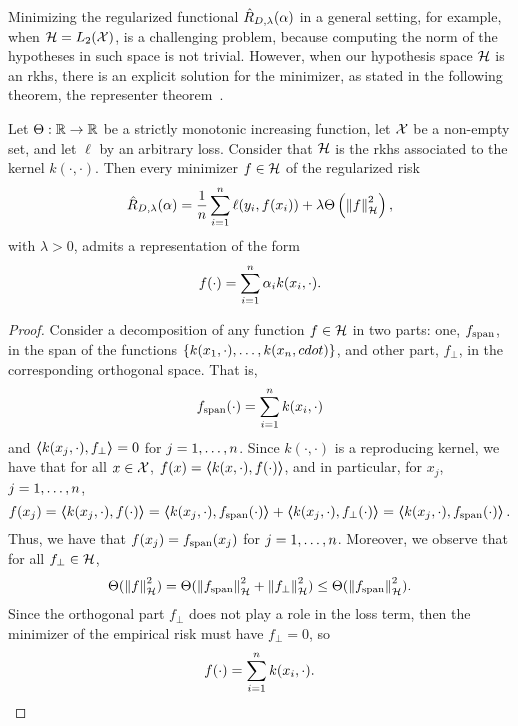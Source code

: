 Minimizing the regularized functional $\hat{R}_{D, \lambda}(\alpha)$ in a general setting, for example, when $\mathcal{H} = L_2(\mathcal{X})$, is a challenging problem, because computing the norm of the hypotheses in such space is not trivial.
%
However, when our hypothesis space $\mathcal{H}$ is an \acrshort{rkhs}, there is an explicit solution for the minimizer, as stated in the following theorem, the representer theorem~\citep{ScholkopfHS01}.
\begin{theorem}\label{th:repr_theorem}
    Let $\Theta: \mathbb{R} \to \mathbb{R}$ be a strictly monotonic increasing function, let $\mathcal{X}$ be a non-empty set, and let $\ell$ by an arbitrary loss. Consider that $\mathcal{H}$ is the \acrshort{rkhs} associated to the kernel $k(\cdot, \cdot)$.
    Then every minimizer $f \in \mathcal{H}$ of the regularized risk 
    \begin{equation}
        \nonumber
        \hat{R}_{D, \lambda}(\alpha) = \frac{1}{n} \sum_{i=1}^n \ell(y_i, f(x_i)) + \lambda \Theta\left(\left\lVert f\right\rVert^2_{\mathcal{H}} \right) ,
    \end{equation}
    with $\lambda > 0$, admits a representation of the form
    \begin{equation}
        \label{eq:reprth_def}
        f(\cdot) = \sum_{i=1}^\nsamples \alpha_i k(x_i, \cdot) .
    \end{equation}
\end{theorem}
\begin{proof}
    Consider a decomposition of any function $f \in \mathcal{H}$ in two parts: one, $f_{\operatorname{span}}$, in the span of the functions $\left\{k(x_1, \cdot), \ldots, k(x_n, cdot)\right\}$, and other part, $f_{\perp}$, in the corresponding orthogonal space. That is,
    \begin{equation}
        \nonumber
        f_{\operatorname{span}}(\cdot) = \sum_{i=1}^n k(x_i, \cdot)
    \end{equation}
    and $\bm{\left\langle} k(x_j, \cdot), f_{\perp} \bm{\right\rangle} = 0$ for $j=1, \ldots, n$.
%
    Since $k(\cdot, \cdot)$ is a reproducing kernel, we have that for all $x \in \mathcal{X}$, 
    $f(x) = \bm{\left\langle} k(x, \cdot), f(\cdot) \bm{\right\rangle}$, and in particular, for $x_j$, $j=1, \ldots, n$,
    \begin{equation}
        \nonumber
        f(x_j) = \bm{\left\langle} k(x_j, \cdot), f(\cdot) \bm{\right\rangle} = \bm{\left\langle} k(x_j, \cdot), f_{\operatorname{span}}(\cdot) \bm{\right\rangle} + \bm{\left\langle} k(x_j, \cdot), f_{\perp}(\cdot) \bm{\right\rangle} = \bm{\left\langle} k(x_j, \cdot), f_{\operatorname{span}}(\cdot) \bm{\right\rangle}.
    \end{equation}
    Thus, we have that $f(x_j) = f_{\operatorname{span}}(x_j)$ for $j=1, \ldots, n$.
    Moreover, we observe that for all $f_{\perp} \in \mathcal{H}$,
    \begin{equation}
        \nonumber
        \Theta(\left\lVert f\right\rVert_{\mathcal{H}}^2) = \Theta(\left\lVert f_{\operatorname{span}}\right\rVert_{\mathcal{H}}^2 + \left\lVert f_{\perp}\right\rVert_{\mathcal{H}}^2) \leq \Theta(\left\lVert f_{\operatorname{span}}\right\rVert_{\mathcal{H}}^2) .
    \end{equation}
    Since the orthogonal part $f_{\perp}$ does not play a role in the loss term, then the minimizer of the empirical risk must have $f_{\perp} = 0$, so 
    $$ f(\cdot) = \sum_{i=1}^n k(x_i, \cdot).$$
\end{proof}
